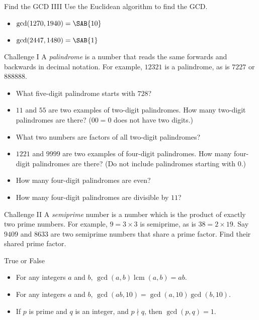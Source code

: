 \documentclass[12pt,letterpaper]{article}
\begin{document}
\begin{problem}{Find the GCD IIII}
 Use the Euclidean algorithm to find the GCD.

 \begin{itemize}
  \item $\gcd(1270, 1940) = \SAB{10}$
  \item $\gcd(2447, 1480) = \SAB{1}$
 \end{itemize}
\end{problem}

\begin{problem}{Challenge I}
 A \emph{palindrome} is a number that reads the same forwards and backwards in
 decimal notation. For example, $12321$ is a palindrome, as is $7227$ or
 $888888$.

 \begin{itemize}
  \item What five-digit palindrome starts with $728$? 
  \item $11$ and $55$ are two examples of two-digit palindromes.
  How many two-digit palindromes are there? ($00=0$ does not have two digits.)
  \item What two numbers are factors of all two-digit palindromes?
  \item $1221$ and $9999$ are two examples of four-digit palindromes. How many
  four-digit palindromes are there? (Do not include palindromes starting with
  $0$.) 
  \item How many four-digit palindromes are even? 
  \item How many four-digit palindromes are divisible by $11$?
 \end{itemize}
\end{problem}

\begin{problem}{Challenge II}
 A \emph{semiprime} number is a number which is the product of exactly two prime
 numbers. For example, $9=3\times3$ is semiprime, as is $38=2\times19$. Say
 $9409$ and $8633$ are two semiprime numbers that share a prime factor. Find
 their shared prime factor. 
\end{problem}

\begin{problem}{True or False}
  \begin{itemize}
    \item For any integers \(a\) and \(b\), \(\gcd(a, b)
    \operatorname{lcm}(a, b) = ab\). \hfill \TFTrue
    \item For any integers \(a\) and \(b\), \(\gcd(ab, 10) = \gcd(a, 10)
    \gcd(b, 10)\). \hfill \TFFalse
    \item If \(p\) is prime and \(q\) is an integer, and \(p \nmid q\), then
    \(\gcd(p, q) = 1\). \hfill \TFTrue
  \end{itemize}
\end{problem}
\end{document}
